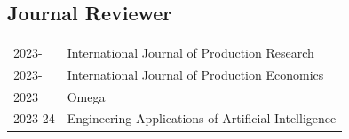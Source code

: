 






\subsection*{Journal Reviewer}
% 
\begin{longtable}[l]{@{}p{} p{}}

    2023- & International Journal of Production Research \\
    2023- & International Journal of Production Economics \\
    2023 & Omega  \\
    2023-24 & Engineering Applications of Artificial Intelligence \\
    
\end{longtable}


